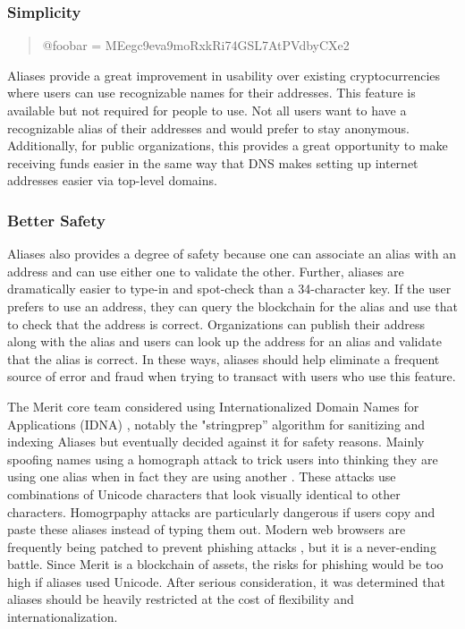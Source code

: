\documentclass{article}
\begin{document}
\subsubsection{Simplicity}
\begin{quote}
    @foobar = MEegc9eva9moRxkRi74GSL7AtPVdbyCXe2
\end{quote}

Aliases provide a great improvement in usability over existing cryptocurrencies 
where users can use recognizable names for their addresses.  This feature is
available but not required for people to use.  Not all users want to have a
recognizable alias of their addresses and would prefer to stay anonymous.
Additionally, for public organizations, this provides a great opportunity to make
receiving funds easier in the same way that DNS makes setting up internet addresses easier
via top-level domains.

\subsubsection{Better Safety}

Aliases also provides a degree of safety because one can associate an alias with an address
and can use either one to validate the other.  Further, aliases are dramatically easier to 
type-in and spot-check than a 34-character key.  If the user prefers to use an address, they
can query the blockchain for the alias and use that to check that the address
is correct.  Organizations can publish their address along with the alias and
users can look up the address for an alias and validate that the alias is correct.
In these ways, aliases should help eliminate a frequent source of error and fraud when trying to transact
with users who use this feature.

The Merit core team considered using Internationalized Domain Names for Applications (IDNA) \cite{IDNA},
notably the "stringprep'' \cite{stringprep} algorithm for sanitizing and
indexing Aliases but eventually decided against it for safety reasons.  Mainly
spoofing names using a homograph attack to trick users into thinking they are
using one alias when in fact they are using another \cite{homograph}.  These attacks
use combinations of Unicode characters that look visually identical to other characters.
Homogrpaphy attacks are particularly dangerous if users copy and paste these aliases
instead of typing them out.  Modern web browsers are frequently being patched to prevent
phishing attacks \cite{phishing}, but it is a never-ending battle.  Since Merit
is a blockchain of assets, the risks for phishing
would be too high if aliases used Unicode.  After serious consideration, it was determined that aliases 
should be heavily restricted at the cost of flexibility and internationalization.
\end{document}
